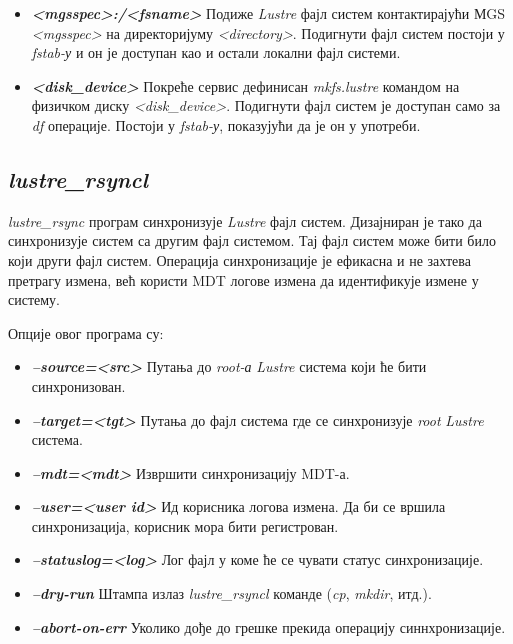 \begin{itemize}

\item \textbf{\textit{<mgsspec>:/<fsname>} }
Подиже   \textit{Lustre} фајл систем контактирајући МGS \textit{<mgsspec>} на директоријуму \textit{<directory>}. Подигнути фајл систем постоји у  \textit{fstab-у} и он је доступан као и остали локални фајл системи.

\item \textbf{\textit{<disk\_device> }}
Покреће сервис дефинисан \textit{mkfs.lustre} командом на физичком диску \textit{<disk\_device>}. Подигнути фајл систем је доступан само за \textit{df} операције. Постоји у \textit{fstab-у}, показујући да је он у употреби.
\end{itemize}

\subsection{\textit{ lustre\_rsyncl}}
\textit{lustre\_rsync} програм синхронизује   \textit{Lustre} фајл систем. Дизајниран је тако да синхронизује систем са другим фајл системом. Тај фајл систем може бити било који други фајл систем. Операција синхронизације је ефикасна и не захтева претрагу измена, већ користи MDT логове измена да идентификује измене у систему. 

Опције овог програма су:

\begin{itemize}
\item \textbf{\textit{--source=<src> }}
Путања до \textit{root-а }  \textit{Lustre} система  који ће бити синхронизован.
\item \textbf{\textit{--target=<tgt> }}
Путања до фајл система где се синхронизује \textit{root}   \textit{Lustre} система.
\item \textbf{\textit{--mdt=<mdt> }}
Извршити синхронизацију MDT-а.
\item \textbf{\textit{--user=<user id>}}
Ид корисника логова измена. Да би се вршила синхронизација, корисник мора бити регистрован.
\item \textbf{\textit{--statuslog=<log> }}
Лог фајл у коме ће се чувати статус синхронизације.
\item \textbf{\textit{--dry-run }}
Штампа излаз \textit{lustre\_rsyncl} команде (\textit{cp}, \textit{mkdir}, итд.).
\item \textbf{\textit{--abort-on-err }}
Уколико дође до грешке прекида операцију синнхронизације.
\end{itemize}


